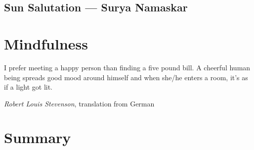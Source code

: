 \documentclass[../main.tex]{subfiles}
\begin{document}
\section{Sun Salutation ---  Surya Namaskar}

\chapter{Mindfulness}

\newpage

\epigraph{I prefer meeting a happy person than finding a five pound bill. A cheerful human being spreads good mood around himself and when she/he enters a room, it's as if a light got lit.}{\textit{Robert Louis Stevenson}, translation from German}

\chapter{Summary}
\end{document}

